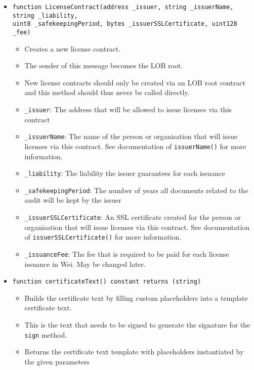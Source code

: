 \documentclass[a4paper]{article}
\begin{document}
\begin{itemize}
  \item \texttt{function LicenseContract(address \_issuer, string \_issuerName, string \_liability, \\uint8 \_safekeepingPeriod, bytes \_issuerSSLCertificate, uint128 \_fee)}
  \begin{itemize}
    \item Creates a new license contract.
    \item The sender of this message becomes the LOB root.
    \item New license contracts should only be created via an LOB root contract and this method should thus never be called directly.
    \item \texttt{\_issuer}: The address that will be allowed to issue licenses via this contract
    \item \texttt{\_issuerName}: The name of the person or organisation that will issue licenses via this contract. See documentation of \texttt{issuerName()} for more information.
    \item \texttt{\_liability}:  The liability the issuer guarantees for each issuance
    \item \texttt{\_safekeepingPeriod}: The number of years all documents related to the audit will be kept by the issuer
    \item \texttt{\_issuerSSLCertificate}: An SSL certificate created for the person or organisation that will issue licenses via this contract. See documentation of \texttt{issuerSSLCertificate()} for more information.
    \item \texttt{\_issuanceFee}: The fee that is required to be paid for each license issuance in Wei. May be changed later.

  \end{itemize}
  
  \item \texttt{function certificateText() constant returns (string)}
  \begin{itemize}
    \item Builds the certificate text by filling custom placeholders into a template certificate text.
    \item This is the text that needs to be signed to generate the signature for the \texttt{sign} method.
    \item Returns the certificate text template with placeholders instantiated by the given parameters
  \end{itemize}
  

\end{itemize}
\end{document}
